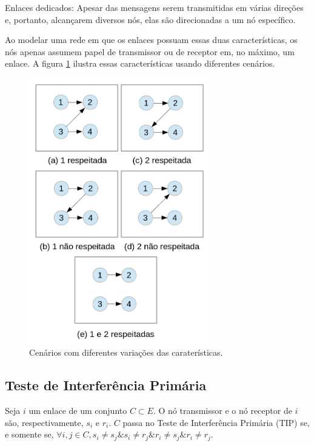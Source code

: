 \item Enlaces dedicados: Apesar das mensagens serem transmitidas em várias direções e, portanto, alcançarem diversos nós, elas são direcionadas a um nó específico. 


Ao modelar uma rede em que os enlaces possuam essas duas características, os nós apenas assumem papel de transmissor ou de receptor em, no máximo, um enlace. A figura \ref{fig:primario} ilustra essas características usando diferentes cenários.

\begin{figure}[htb]
\centering
\includegraphics[width=0.7\textwidth]{figs/primario}
\caption[Cenários com diferentes variações das caraterísticas.]
{Cenários com diferentes variações das caraterísticas.}
\label{fig:primario}
\end{figure}

\subsection{Teste de Interferência Primária}

Seja $i$ um enlace de um conjunto $C \subset E$. O nó transmissor e o nó receptor de $i$ são, respectivamente, $s_{i}$ e $r_{i}$. $C$ passa no Teste de Interferência Primária (TIP) se, e somente se, $\forall i,j \in C, s_{i} \neq s_{j} \& s_{i} \neq r_{j} \& r_{i} \neq s_{j} \& r_{i} \neq r_{j}$. 

